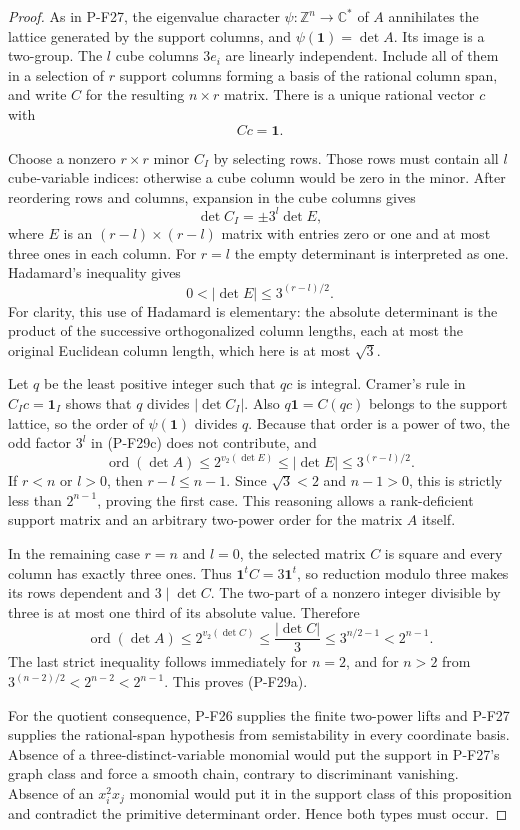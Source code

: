 \begin{proof}
As in P-F27, the eigenvalue character
$\psi:\mathbb Z^n\to\mathbb C^*$ of $A$ annihilates
the lattice generated by the support columns, and
$\psi(\mathbf1)=\det A$. Its image is a two-group.
The $l$ cube columns $3e_i$ are linearly independent.
Include all of them in a selection of $r$ support columns
forming a basis of the rational column span, and write
$C$ for the resulting $n\times r$ matrix. There is a
unique rational vector $c$ with
\[
 Cc=\mathbf1.
 \tag{P-F29b}
\]

Choose a nonzero $r\times r$ minor $C_I$ by selecting
rows. Those rows must contain all $l$ cube-variable
indices: otherwise a cube column would be zero in the
minor. After reordering rows and columns, expansion in
the cube columns gives
\[
 \det C_I=\pm3^l\det E,
 \tag{P-F29c}
\]
where $E$ is an $(r-l)\times(r-l)$ matrix with entries
zero or one and at most three ones in each column.
For $r=l$ the empty determinant is interpreted as one.
Hadamard's inequality gives
\[
 0<|\det E|\le3^{(r-l)/2}.
 \tag{P-F29d}
\]
For clarity, this use of Hadamard is elementary: the
absolute determinant is the product of the successive
orthogonalized column lengths, each at most the original
Euclidean column length, which here is at most $\sqrt3$.

Let $q$ be the least positive integer such that $qc$ is
integral. Cramer's rule in $C_Ic=\mathbf1_I$ shows that
$q$ divides $|\det C_I|$. Also
$q\mathbf1=C(qc)$ belongs to the support lattice, so
the order of $\psi(\mathbf1)$ divides $q$.
Because that order is a power of two, the odd factor
$3^l$ in (P-F29c) does not contribute, and
\[
 \operatorname{ord}(\det A)
       \le 2^{v_2(\det E)}
       \le |\det E|\le3^{(r-l)/2}.
 \tag{P-F29e}
\]
If $r<n$ or $l>0$, then $r-l\le n-1$.
Since $\sqrt3<2$ and $n-1>0$, this is strictly less
than $2^{n-1}$, proving the first case. This reasoning
allows a rank-deficient support matrix and an arbitrary
two-power order for the matrix $A$ itself.

In the remaining case $r=n$ and $l=0$, the selected
matrix $C$ is square and every column has exactly three
ones. Thus
$\mathbf1^tC=3\mathbf1^t$, so reduction modulo three
makes its rows dependent and $3\mid\det C$.
The two-part of a nonzero integer divisible by three
is at most one third of its absolute value. Therefore
\[
 \operatorname{ord}(\det A)
    \le 2^{v_2(\det C)}
    \le\frac{|\det C|}{3}
    \le3^{n/2-1}<2^{n-1}.
 \tag{P-F29f}
\]
The last strict inequality follows immediately for
$n=2$, and for $n>2$ from
$3^{(n-2)/2}<2^{n-2}<2^{n-1}$.
This proves (P-F29a).

For the quotient consequence, P-F26 supplies the finite
two-power lifts and P-F27 supplies the rational-span
hypothesis from semistability in every coordinate basis.
Absence of a three-distinct-variable monomial would put
the support in P-F27's graph class and force a smooth
chain, contrary to discriminant vanishing. Absence of
an $x_i^2x_j$ monomial would put it in the support class
of this proposition and contradict the primitive
determinant order. Hence both types must occur.
\end{proof}

